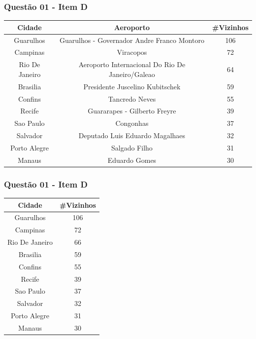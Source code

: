 \documentclass[aspectratio=169,usenames,dvipsnames]{beamer}
\begin{document}
\begin{frame}
  \frametitle{Questão 01 - Item D}

  \begin{tabular}{|c|c|c|}
    \hline
    Cidade & Aeroporto & \#Vizinhos \\
    \hline
    Guarulhos & Guarulhos - Governador Andre Franco Montoro & 106 \\
    \hline
    Campinas & Viracopos & 72 \\
    \hline
    Rio De Janeiro & Aeroporto Internacional Do Rio De Janeiro/Galeao & 64 \\
    \hline
    Brasilia & Presidente Juscelino Kubitschek & 59 \\
    \hline
    Confins & Tancredo Neves & 55 \\
    \hline
    Recife & Guararapes - Gilberto Freyre & 39 \\
    \hline
    Sao Paulo & Congonhas & 37 \\
    \hline
    Salvador & Deputado Luis Eduardo Magalhaes & 32 \\
    \hline
    Porto Alegre & Salgado Filho & 31 \\
    \hline
    Manaus & Eduardo Gomes & 30 \\
    \hline
  \end{tabular}

\end{frame}

\begin{frame}
  \frametitle{Questão 01 - Item D}
  \begin{center}
    \begin{tabular}{|c|c|}
    \hline
    Cidade & \#Vizinhos \\
    \hline
    Guarulhos & 106 \\
    \hline
    Campinas & 72 \\
    \hline
    Rio De Janeiro & 66 \\
    \hline
    Brasilia & 59 \\
    \hline
    Confins & 55 \\
    \hline
    Recife & 39 \\
    \hline
    Sao Paulo & 37 \\
    \hline
    Salvador & 32 \\
    \hline
    Porto Alegre & 31 \\
    \hline
    Manaus & 30 \\
    \hline
    \end{tabular}
  \end{center}
\end{frame}
\end{document}
